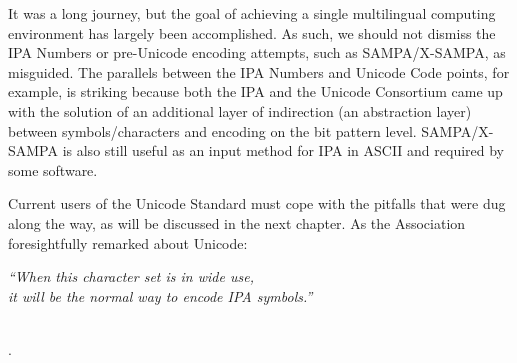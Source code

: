 
It was a long journey, but the goal of achieving a single multilingual computing
environment has largely been accomplished. As such, we should not dismiss the IPA Numbers 
or pre-Unicode encoding attempts, such as SAMPA/X-SAMPA, as misguided. The parallels 
between the IPA Numbers and Unicode Code points, for example, is striking because both the IPA and 
the Unicode Consortium came up with the solution of an additional layer of indirection (an abstraction layer) 
between symbols/characters and encoding on the bit pattern level. SAMPA/X-SAMPA is also still useful 
as an input method for IPA in ASCII and required by some software.

Current users of the Unicode Standard must cope
with the pitfalls that were dug along the way, as will be discussed in the next
chapter. As the Association foresightfully remarked about Unicode:

\begin{center} 

\textit{``When this character set is in wide use, \\
it will be the normal way to encode IPA symbols.''}

\ \\

\citep[164]{IPA1999}.

\end{center}



